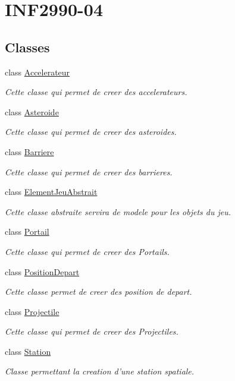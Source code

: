 \hypertarget{group___i_n_f2990-04}{\section{I\-N\-F2990-\/04}
\label{group___i_n_f2990-04}
}
\subsection*{Classes}
\begin{DoxyCompactItemize}
\item 
class \hyperlink{class_accelerateur}{Accelerateur}
\begin{DoxyCompactList}\small\item\em Cette classe qui permet de creer des accelerateurs. \end{DoxyCompactList}\item 
class \hyperlink{class_asteroide}{Asteroide}
\begin{DoxyCompactList}\small\item\em Cette classe qui permet de creer des asteroides. \end{DoxyCompactList}\item 
class \hyperlink{class_barriere}{Barriere}
\begin{DoxyCompactList}\small\item\em Cette classe qui permet de creer des barrieres. \end{DoxyCompactList}\item 
class \hyperlink{class_element_jeu_abstrait}{Element\-Jeu\-Abstrait}
\begin{DoxyCompactList}\small\item\em Cette classe abstraite servira de modele pour les objets du jeu. \end{DoxyCompactList}\item 
class \hyperlink{class_portail}{Portail}
\begin{DoxyCompactList}\small\item\em Cette classe qui permet de creer des Portails. \end{DoxyCompactList}\item 
class \hyperlink{class_position_depart}{Position\-Depart}
\begin{DoxyCompactList}\small\item\em Cette classe permet de creer des position de depart. \end{DoxyCompactList}\item 
class \hyperlink{class_projectile}{Projectile}
\begin{DoxyCompactList}\small\item\em Cette classe qui permet de creer des Projectiles. \end{DoxyCompactList}\item 
class \hyperlink{class_station}{Station}
\begin{DoxyCompactList}\small\item\em Classe permettant la creation d'une station spatiale. \end{DoxyCompactList}\end{DoxyCompactItemize}

